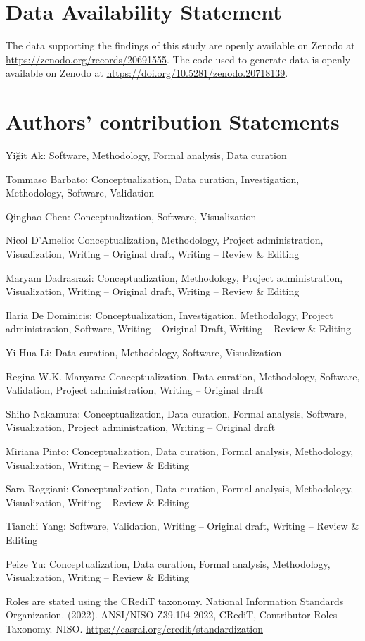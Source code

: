 \documentclass[year=2026]{cup-journal}
\begin{document}
\section*{Data Availability Statement}
The data supporting the findings of this study are openly available on Zenodo at \url{https://zenodo.org/records/20691555}. The code used to generate data is openly available on Zenodo at \url{https://doi.org/10.5281/zenodo.20718139}.

\section*{Authors' contribution Statements}
\noindent Yiğit Ak: Software, Methodology, Formal analysis, Data curation\par\medskip
\noindent Tommaso Barbato: Conceptualization, Data curation, Investigation, Methodology, Software, Validation\par\medskip
\noindent Qinghao Chen: Conceptualization, Software, Visualization\par\medskip
\noindent Nicol D'Amelio: Conceptualization, Methodology, Project administration, Visualization, Writing -- Original draft, Writing -- Review \& Editing\par\medskip
\noindent Maryam Dadrasrazi: Conceptualization, Methodology, Project administration, Visualization, Writing -- Original draft, Writing -- Review \& Editing\par\medskip
\noindent Ilaria De Dominicis: Conceptualization, Investigation, Methodology, Project administration, Software, Writing -- Original Draft, Writing -- Review \& Editing\par\medskip
\noindent Yi Hua Li: Data curation, Methodology, Software, Visualization\par\medskip
\noindent Regina W.K. Manyara: Conceptualization, Data curation, Methodology, Software, Validation, Project administration, Writing -- Original draft\par\medskip
\noindent Shiho Nakamura: Conceptualization, Data curation, Formal analysis, Software, Visualization, Project administration, Writing -- Original draft\par\medskip
\noindent Miriana Pinto: Conceptualization, Data curation, Formal analysis, Methodology, Visualization, Writing -- Review \& Editing\par\medskip
\noindent Sara Roggiani: Conceptualization, Data curation, Formal analysis, Methodology, Visualization, Writing -- Review \& Editing\par\medskip
\noindent Tianchi Yang: Software, Validation, Writing -- Original draft, Writing -- Review \& Editing\par\medskip
\noindent Peize Yu: Conceptualization, Data curation, Formal analysis, Methodology, Visualization, Writing -- Review \& Editing\par\medskip
\noindent Roles are stated using the CRediT taxonomy.
National Information Standards Organization. (2022). ANSI/NISO Z39.104-2022, CRediT, Contributor Roles Taxonomy. NISO. \url{https://casrai.org/credit/standardization}\par\medskip
\end{document}
